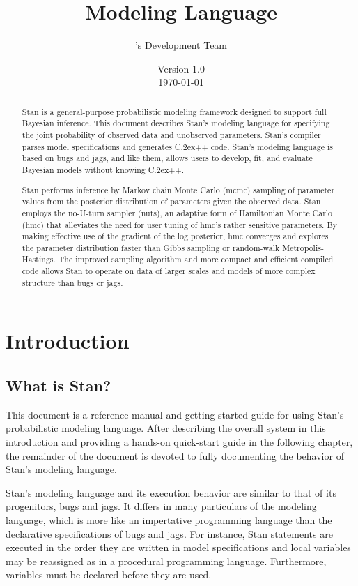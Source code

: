 \documentclass[10pt]{report}
\title{\Huge\bf \Stan Modeling Language}
\author{\Stan's Development Team}
\date{\vspace*{36pt} Version 1.0 \\[4pt] {\small \today}} %
\newcommand{\Stan}{Stan\xspace}
\newcommand*{\Cpp}{C\raise.2ex\hbox{\footnotesize ++}\xspace} %
\newcommand{\acronym}[1]{{\sc #1}\xspace}
\newcommand{\BUGS}{\acronym{bugs}}
\newcommand{\JAGS}{\acronym{jags}}
\newcommand{\MCMC}{\acronym{mcmc}}
\newcommand{\HMC}{\acronym{hmc}}
\newcommand{\NUTS}{\acronym{nuts}}
\begin{document}
\maketitle

\begin{abstract}
  \Stan is a general-purpose probabilistic modeling framework designed
  to support full Bayesian inference.  This document describes \Stan's
  modeling language for specifying the joint probability of observed
  data and unobserved parameters.  \Stan's compiler parses model
  specifications and generates \Cpp code.  \Stan's modeling language
  is based on \BUGS and \JAGS, and like them, allows users to develop,
  fit, and evaluate Bayesian models without knowing \Cpp.

  \Stan performs inference by Markov chain Monte Carlo (\MCMC)
  sampling of parameter values from the posterior distribution of
  parameters given the observed data.  \Stan employs the no-U-turn
  sampler (\NUTS), an adaptive form of Hamiltonian Monte Carlo (\HMC)
  that alleviates the need for user tuning of \HMC's rather sensitive
  parameters.  By making effective use of the gradient of the log
  posterior, \HMC converges and explores the parameter distribution
  faster than Gibbs sampling or random-walk Metropolis-Hastings.  The
  improved sampling algorithm and more compact and efficient compiled
  code allows \Stan to operate on data of larger scales and models of
  more complex structure than \BUGS or \JAGS.
\end{abstract}

\tableofcontents

\part{Introduction}

\chapter{What is \Stan?}

This document is a reference manual and getting started guide for
using \Stan's probabilistic modeling language.  After describing the
overall system in this introduction and providing a hands-on
quick-start guide in the following chapter, the remainder of the
document is devoted to fully documenting the behavior of
Stan's modeling language.

\Stan's modeling language and its execution behavior are similar to
that of its progenitors, \BUGS and \JAGS.  It differs in many
particulars of the modeling language, which is more like an
impertative programming language than the declarative specifications
of \BUGS and \JAGS.  For instance, \Stan statements are executed in
the order they are written in model specifications and local variables
may be reassigned as in a procedural programming language.
Furthermore, variables must be declared before they are used.
\end{document}
